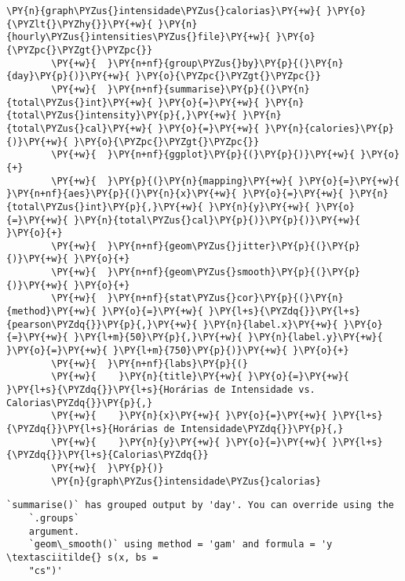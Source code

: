 \begin{tcolorbox}[breakable, size=fbox, boxrule=1pt, pad at break*=1mm,colback=cellbackground, colframe=cellborder]
    \begin{Verbatim}[commandchars=\\\{\}]
        \PY{n}{graph\PYZus{}intensidade\PYZus{}calorias}\PY{+w}{ }\PY{o}{\PYZlt{}\PYZhy{}}\PY{+w}{ }\PY{n}{hourly\PYZus{}intensities\PYZus{}file}\PY{+w}{ }\PY{o}{\PYZpc{}\PYZgt{}\PYZpc{}}
        \PY{+w}{  }\PY{n+nf}{group\PYZus{}by}\PY{p}{(}\PY{n}{day}\PY{p}{)}\PY{+w}{ }\PY{o}{\PYZpc{}\PYZgt{}\PYZpc{}}
        \PY{+w}{  }\PY{n+nf}{summarise}\PY{p}{(}\PY{n}{total\PYZus{}int}\PY{+w}{ }\PY{o}{=}\PY{+w}{ }\PY{n}{total\PYZus{}intensity}\PY{p}{,}\PY{+w}{ }\PY{n}{total\PYZus{}cal}\PY{+w}{ }\PY{o}{=}\PY{+w}{ }\PY{n}{calories}\PY{p}{)}\PY{+w}{ }\PY{o}{\PYZpc{}\PYZgt{}\PYZpc{}}
        \PY{+w}{  }\PY{n+nf}{ggplot}\PY{p}{(}\PY{p}{)}\PY{+w}{ }\PY{o}{+}
        \PY{+w}{  }\PY{p}{(}\PY{n}{mapping}\PY{+w}{ }\PY{o}{=}\PY{+w}{ }\PY{n+nf}{aes}\PY{p}{(}\PY{n}{x}\PY{+w}{ }\PY{o}{=}\PY{+w}{ }\PY{n}{total\PYZus{}int}\PY{p}{,}\PY{+w}{ }\PY{n}{y}\PY{+w}{ }\PY{o}{=}\PY{+w}{ }\PY{n}{total\PYZus{}cal}\PY{p}{)}\PY{p}{)}\PY{+w}{ }\PY{o}{+}
        \PY{+w}{  }\PY{n+nf}{geom\PYZus{}jitter}\PY{p}{(}\PY{p}{)}\PY{+w}{ }\PY{o}{+}
        \PY{+w}{  }\PY{n+nf}{geom\PYZus{}smooth}\PY{p}{(}\PY{p}{)}\PY{+w}{ }\PY{o}{+}
        \PY{+w}{  }\PY{n+nf}{stat\PYZus{}cor}\PY{p}{(}\PY{n}{method}\PY{+w}{ }\PY{o}{=}\PY{+w}{ }\PY{l+s}{\PYZdq{}}\PY{l+s}{pearson\PYZdq{}}\PY{p}{,}\PY{+w}{ }\PY{n}{label.x}\PY{+w}{ }\PY{o}{=}\PY{+w}{ }\PY{l+m}{50}\PY{p}{,}\PY{+w}{ }\PY{n}{label.y}\PY{+w}{ }\PY{o}{=}\PY{+w}{ }\PY{l+m}{750}\PY{p}{)}\PY{+w}{ }\PY{o}{+}
        \PY{+w}{  }\PY{n+nf}{labs}\PY{p}{(}
        \PY{+w}{    }\PY{n}{title}\PY{+w}{ }\PY{o}{=}\PY{+w}{ }\PY{l+s}{\PYZdq{}}\PY{l+s}{Horárias de Intensidade vs. Calorias\PYZdq{}}\PY{p}{,}
        \PY{+w}{    }\PY{n}{x}\PY{+w}{ }\PY{o}{=}\PY{+w}{ }\PY{l+s}{\PYZdq{}}\PY{l+s}{Horárias de Intensidade\PYZdq{}}\PY{p}{,}
        \PY{+w}{    }\PY{n}{y}\PY{+w}{ }\PY{o}{=}\PY{+w}{ }\PY{l+s}{\PYZdq{}}\PY{l+s}{Calorias\PYZdq{}}
        \PY{+w}{  }\PY{p}{)}
        \PY{n}{graph\PYZus{}intensidade\PYZus{}calorias}
    \end{Verbatim}
\end{tcolorbox}

\begin{Verbatim}[commandchars=\\\{\}]
    `summarise()` has grouped output by 'day'. You can override using the
    `.groups`
    argument.
    `geom\_smooth()` using method = 'gam' and formula = 'y \textasciitilde{} s(x, bs =
    "cs")'
\end{Verbatim}

